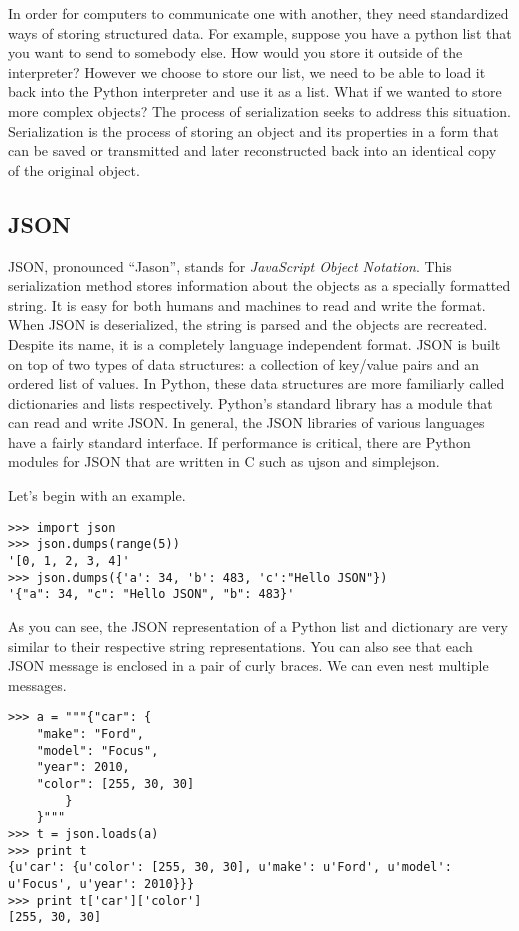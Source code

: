 \label{lab:webtech}

In order for computers to communicate one with another, they need standardized ways of storing structured data.
For example, suppose you have a python list that you want to send to somebody else. How would you store it outside of the interpreter?
However we choose to store our list, we need to be able to load it back into the Python interpreter and use it as a list.
What if we wanted to store more complex objects?
The process of serialization seeks to address this situation.
Serialization is the process of storing an object and its properties in a form that can be saved or transmitted and later reconstructed back into an identical copy of the original object.

\subsection*{JSON}
JSON, pronounced ``Jason'', stands for \emph{JavaScript Object Notation}.
This serialization method stores information about the objects as a specially formatted string.
It is easy for both humans and machines to read and write the format.
When JSON is deserialized, the string is parsed and the objects are recreated.
Despite its name, it is a completely language independent format.
JSON is built on top of two types of data structures: a collection of key/value pairs and an ordered list of values.
In Python, these data structures are more familiarly called dictionaries and lists respectively.
Python's standard library has a module that can read and write JSON.
In general, the JSON libraries of various languages have a fairly standard interface.
If performance is critical, there are Python modules for JSON that are written in C such as ujson and simplejson.

Let's begin with an example.
\begin{lstlisting}
>>> import json
>>> json.dumps(range(5))
'[0, 1, 2, 3, 4]'
>>> json.dumps({'a': 34, 'b': 483, 'c':"Hello JSON"})
'{"a": 34, "c": "Hello JSON", "b": 483}'
\end{lstlisting}
As you can see, the JSON representation of a Python list and dictionary are very similar to their respective string representations.
You can also see that each JSON message is enclosed in a pair of curly braces.
We can even nest multiple messages.
\begin{lstlisting}
>>> a = """{"car": {
    "make": "Ford",
    "model": "Focus",
    "year": 2010,
    "color": [255, 30, 30]
        }
    }"""
>>> t = json.loads(a)
>>> print t 
{u'car': {u'color': [255, 30, 30], u'make': u'Ford', u'model': u'Focus', u'year': 2010}}}
>>> print t['car']['color']
[255, 30, 30]
\end{lstlisting}

